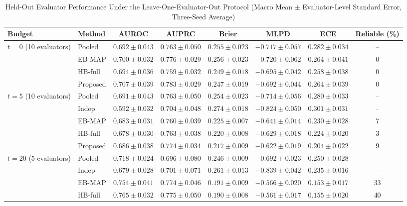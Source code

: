 \documentclass[lettersize,journal]{IEEEtran}
\begin{document}
\begin{table}[t]
\caption{Held-Out Evaluator Performance Under the Leave-One-Evaluator-Out Protocol (Macro Mean $\pm$ Evaluator-Level Standard Error, Three-Seed Average)}
\label{tab:main}
\centering
\setlength{\tabcolsep}{4.5pt}
\begin{tabular}{llcccccc}
\toprule
Budget & Method & AUROC & AUPRC & Brier & MLPD & ECE & Reliable (\%) \\
\midrule
\multirow{4}{*}{$t=0$ (10 evaluators)}
 & Pooled   & $0.692\pm0.043$ & $0.763\pm0.050$ & $0.255\pm0.023$ & $-0.717\pm0.057$ & $0.282\pm0.034$ & -- \\
 & EB-MAP   & $0.700\pm0.032$ & $0.776\pm0.029$ & $0.256\pm0.023$ & $-0.720\pm0.062$ & $0.264\pm0.041$ & 0 \\
 & HB-full  & $0.694\pm0.036$ & $0.759\pm0.032$ & $0.249\pm0.018$ & $-0.695\pm0.042$ & $0.258\pm0.038$ & 0 \\
 & Proposed & $\mathbf{0.707}\pm0.039$ & $\mathbf{0.783}\pm0.029$ & $\mathbf{0.247}\pm0.019$ & $\mathbf{-0.692}\pm0.044$ & $0.264\pm0.039$ & 0 \\
\midrule
\multirow{5}{*}{$t=5$ (10 evaluators)}
 & Pooled   & $0.691\pm0.043$ & $0.763\pm0.050$ & $0.254\pm0.023$ & $-0.714\pm0.056$ & $0.280\pm0.033$ & -- \\
 & Indep    & $0.592\pm0.032$ & $0.704\pm0.048$ & $0.274\pm0.018$ & $-0.824\pm0.050$ & $0.301\pm0.031$ & -- \\
 & EB-MAP   & $0.683\pm0.031$ & $0.760\pm0.039$ & $0.225\pm0.007$ & $-0.641\pm0.014$ & $0.230\pm0.028$ & 7 \\
 & HB-full  & $0.678\pm0.030$ & $0.763\pm0.038$ & $0.220\pm0.008$ & $-0.629\pm0.018$ & $0.224\pm0.020$ & 3 \\
 & Proposed & $0.686\pm0.038$ & $\mathbf{0.774}\pm0.034$ & $\mathbf{0.217}\pm0.009$ & $\mathbf{-0.622}\pm0.019$ & $\mathbf{0.204}\pm0.022$ & 9 \\
\midrule
\multirow{5}{*}{$t=20$ (5 evaluators)}
 & Pooled   & $0.718\pm0.024$ & $0.696\pm0.080$ & $0.246\pm0.009$ & $-0.692\pm0.023$ & $0.250\pm0.028$ & -- \\
 & Indep    & $0.679\pm0.028$ & $0.701\pm0.071$ & $0.261\pm0.013$ & $-0.839\pm0.042$ & $0.235\pm0.016$ & -- \\
 & EB-MAP   & $0.754\pm0.041$ & $0.774\pm0.046$ & $0.191\pm0.009$ & $-0.566\pm0.020$ & $0.153\pm0.017$ & 33 \\
 & HB-full  & $0.765\pm0.032$ & $0.775\pm0.050$ & $0.190\pm0.008$ & $-0.561\pm0.017$ & $0.155\pm0.020$ & 40 \\

\end{tabular}
\end{table}
\end{document}
